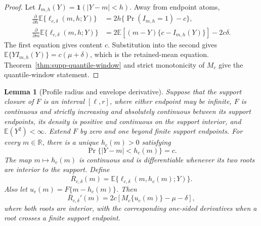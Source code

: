 \documentclass[11pt]{article}
\newcommand{\R}{\mathbb{R}}
\newcommand{\E}{\mathbb{E}}
\newcommand{\ind}{\mathbf{1}}
\newtheorem{lemma}{Lemma}
\begin{document}
\begin{proof}
Let \(I_{m,h}(Y)=\ind(|Y-m|<h)\). Away from endpoint atoms,
\begin{align}
\frac{\partial}{\partial h}\E\{\ell_{c,\delta}(m,h;Y)\}
&=2h\{\Pr(I_{m,h}=1)-c\},\\
\frac{\partial}{\partial m}\E\{\ell_{c,\delta}(m,h;Y)\}
&=2\E[(m-Y)\{c-I_{m,h}(Y)\}]-2c\delta.
\end{align}
The first equation gives content \(c\). Substitution into the second gives
\(\E\{YI_{m,h}(Y)\}=c(\mu+\delta)\), which is the retained-mean equation.
Theorem~\ref{thm:supp-quantile-window} and strict monotonicity of \(M_c\)
give the quantile-window statement.
\end{proof}

\begin{lemma}[Profile radius and envelope derivative]
\label{lem:supp-profile-radius}
Suppose that the support closure of \(F\) is an interval
\([\ell,r]\), where either endpoint may be infinite, \(F\) is continuous and
strictly increasing and absolutely continuous between its support endpoints,
its density is positive and continuous on the support interior, and
\(\E(Y^2)<\infty\). Extend \(F\) by zero and one beyond finite support
endpoints. For every \(m\in\R\), there is a unique \(h_c(m)>0\) satisfying
\[
\Pr\{|Y-m|<h_c(m)\}=c.
\]
The map \(m\mapsto h_c(m)\) is continuous and is differentiable whenever its
two roots are interior to the support. Define
\[
\overline R_{c,\delta}(m)
=
\E\{\ell_{c,\delta}(m,h_c(m);Y)\}.
\]
Also let \(u_c(m)=F\{m-h_c(m)\}\). Then
\begin{equation}
\overline R_{c,\delta}'(m)
=2c\left[M_c\{u_c(m)\}-\mu-\delta\right],
\label{eq:supp-profiled-risk-derivative}
\end{equation}
where both roots are interior, with the corresponding one-sided derivatives
when a root crosses a finite support endpoint.
\end{lemma}
\end{document}

